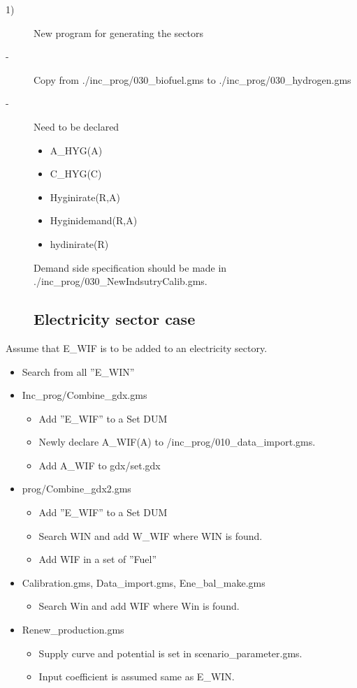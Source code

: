 \documentclass[10pt,a4paper,titlepage,dvipdfmx]{book}
\begin{document}
\begin{description}
\item[1)]New program for generating the sectors
\item[-]Copy from ./inc\_prog/030\_biofuel.gms to ./inc\_prog/030\_hydrogen.gms
\item[-]Need to be declared
\begin{itemize}
\item \textcolor{color-3}{A\_HYG(A)}
\item \textcolor{color-3}{C\_HYG(C)}
\item Hyginirate(R,A)
\item Hyginidemand(R,A)
\item hydinirate(R)
\end{itemize}

Demand side specification should be made in ./inc\_prog/030\_NewIndsutryCalib.gms.

\subsection{\label{subsec:ElecSecCas}Electricity sector case}

\end{description}
Assume that E\_WIF is to be added to an electricity sectory.
\begin{itemize}
\item Search from all ''E\_WIN''
\item Inc\_prog/Combine\_gdx.gms
\begin{itemize}
\item Add ''E\_WIF'' to a Set DUM
\item Newly declare A\_WIF(A) to /inc\_prog/010\_data\_import.gms.
\item Add A\_WIF to gdx/set.gdx
\end{itemize}

\item prog/Combine\_gdx2.gms
\begin{itemize}
\item Add ''E\_WIF'' to a Set DUM
\item Search WIN  and add W\_WIF where WIN is found.
\item Add WIF in a set of ''Fuel''
\end{itemize}

\item Calibration.gms, Data\_import.gms, Ene\_bal\_make.gms
\begin{itemize}
\item Search Win and add WIF where Win is found.
\end{itemize}

\item Renew\_production.gms
\begin{itemize}
\item Supply curve and potential is set in scenario\_parameter.gms.
\item Input coefficient is assumed same as E\_WIN.
\end{itemize}

\end{itemize}
\end{document}
